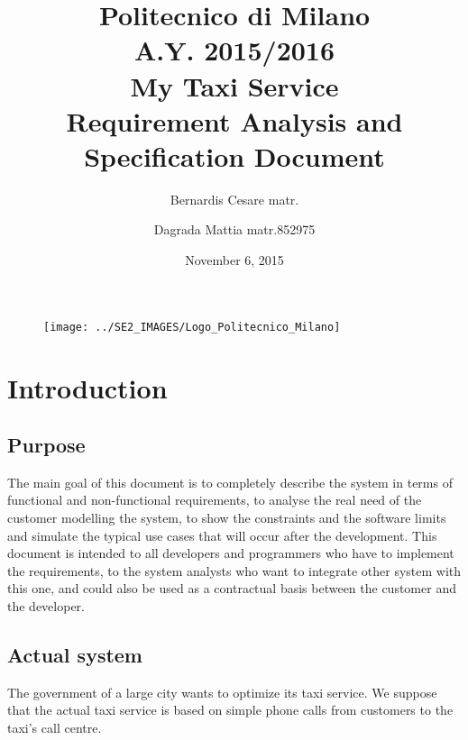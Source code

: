 \documentclass[11pt,a4paper,titlepage]{article}
\begin{document}
\begin{figure}
	\centering
	\texttt{[image: ../SE2\_IMAGES/Logo\_Politecnico\_Milano]}
\end{figure}
\title{Politecnico di Milano\\A.Y. 2015/2016\\\textbf{My Taxi Service}\\Requirement Analysis and Specification Document\\}
\author{Bernardis Cesare matr. \and Dagrada Mattia matr.852975}
\date{November 6, 2015}
\maketitle

\newpage
\tableofcontents

\newpage

\section{Introduction}

\subsection{Purpose}
The main goal of this document is to completely describe the system in terms of functional and non-functional requirements, to analyse the real need of the customer modelling the system, to show the constraints and the software limits and simulate the typical use cases that will occur after the development. This document is intended to all developers and programmers who have to implement the requirements, to the system analysts who want to integrate other system with this one, and could also be used as a contractual basis between the customer and the developer.
\subsection{Actual system}
The government of a large city wants to optimize its taxi service. We suppose that the actual taxi service is based on simple phone calls from customers to the taxi's call centre.
\end{document}

